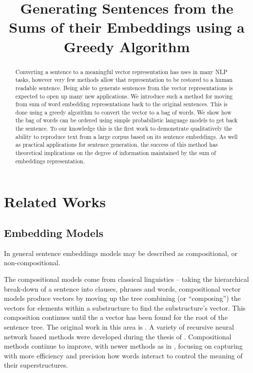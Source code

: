 \documentclass[11pt]{article}
\title{Generating Sentences from the Sums of their Embeddings using a Greedy Algorithm}
\author{}
\theoremstyle{plain}
\theoremstyle{definition}
\begin{document}
\maketitle

\begin{abstract}
Converting a sentence to a meaningful vector representation has uses in many NLP tasks, however very few methods allow that representation to be restored to a human readable sentence. Being able to generate sentences from the vector representations is expected to open up many new applications. We introduce such a method for moving from sum of word embedding representations back to the original sentences. This is done using a greedy algorithm to convert the vector to a bag of words. We show how the bag of words can be ordered using simple probabilistic language models to get back the sentence. To our knowledge this is the first work to demonstrate qualitatively the ability to reproduce text from a large corpus based on its sentence embeddings. 
As well as practical applications for sentence generation, the success of this method has theoretical implications on the degree of information maintained by the sum of embeddings representation.

\end{abstract}
  

\section{Related Works}\label{relwork}

\subsection{Embedding Models}
In general sentence embeddings models may be described as compositional, or non-compositional. 

The compositional models come from classical linguistics -- taking the hierarchical  break-down of a sentence into clauses, phrases and words, compositional vector models produce vectors by moving up the tree combining (or ``composing'') the vectors for elements within a substructure to find the substructure's vector. This composition continues until the a vector has been found for the root of the sentence tree. The original work in this area is \textcite{Mitchell2008}. A variety of recursive neural network based methods were developed during the thesis of \textcite{socher2014recursive}. Compositional methods continue to improve, with newer methods as in \textcite{TACL15CompVector}, focusing on capturing with more efficiency and precision how words interact to control the meaning of their superstructures. 
\end{document}
